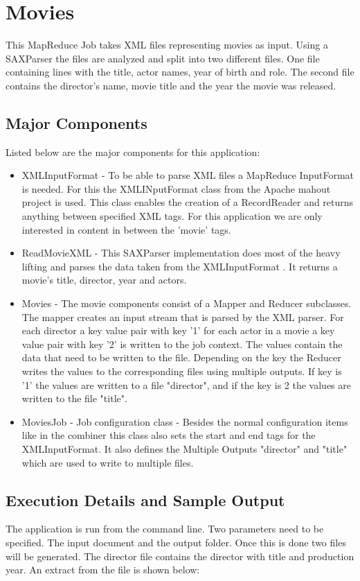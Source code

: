 \documentclass[Movies.tex]{subfiles}
\begin{document}
\section{Movies}
This MapReduce Job takes XML files representing movies as input. Using a SAXParser the files are analyzed and split into two different files. One file containing lines with the title, actor names, year of birth and role. The second file contains the director's name, movie title and the year the movie was released.

\subsection{Major Components}
Listed below are the major components for this application:
\begin{itemize}
\item XMLInputFormat - To be able to parse XML files a MapReduce InputFormat is needed. For this the XMLINputFormat class from the Apache mahout project is used. This class enables the creation of a RecordReader and returns anything between specified XML tags. For this application we are only interested in content in between the 'movie' tags.
\item ReadMovieXML - This SAXParser implementation does most of the heavy lifting and parses the data taken from the XMLInputFormat . It returns a movie's title, director, year and actors.
\item Movies - The movie components consist of a Mapper and Reducer subclasses. The mapper creates an input stream that is parsed by the XML parser. For each director a key value pair with key '1' for each actor in a movie a key value pair with key '2' is written to the job context. The values contain the data that need to be written to the file. Depending on the key the Reducer writes the values to the corresponding files using multiple outputs. If key is '1' the values are written to a file "director", and if the key is 2 the values are written to the file "title".
\item MoviesJob - Job configuration class - Besides the normal configuration items like in the combiner this class also sets the start and end tags for the XMLInputFormat. It also defines the Multiple Outputs "director" and "title" which are used to write to multiple files.
\end{itemize}

\subsection{Execution Details and Sample Output}
The application is run from the command line. Two parameters need to be specified. The input document and the output folder. Once this is done two files will be generated. The  director file contains the director with title and production year. An extract from the file is shown below:
\end{document}
